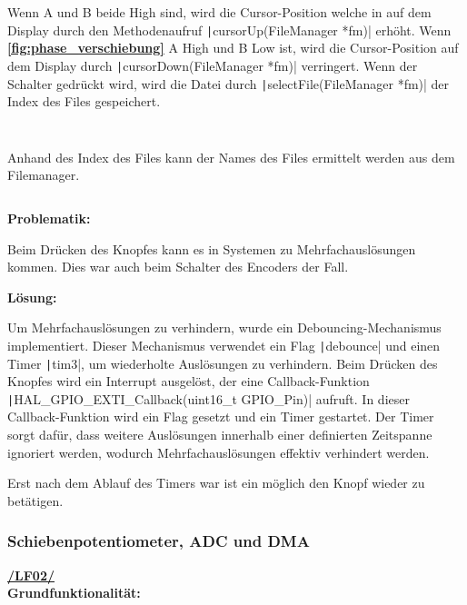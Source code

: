 Wenn A und B beide High sind\cite{rotary-encoder}, wird die Cursor-Position welche in auf dem Display durch den Methodenaufruf \texttt|cursorUp(FileManager *fm)|
erhöht. Wenn  \textbf{\autoref{fig:phase_verschiebung}} A High und B Low ist, wird die Cursor-Position auf dem Display durch \texttt|cursorDown(FileManager *fm)| verringert. Wenn der Schalter gedrückt wird, wird die Datei durch \texttt|selectFile(FileManager *fm)| der Index des Files gespeichert. 

\newpage 
 \inputminted[firstline=68, lastline=74]{c}{../../f401_display_encoder_fader_test/Core/Src/filemanager.c}
 
  \inputminted[firstline=84, lastline=90]{c}{../../f401_display_encoder_fader_test/Core/Src/filemanager.c}
  
Anhand des Index des Files kann der Names des Files ermittelt werden aus dem Filemanager.

	
\inputminted[firstline=159, lastline=161]{c}{../../f401_display_encoder_fader_test/Core/Src/filemanager.c}

\textbf{Problematik:}

Beim Drücken des Knopfes kann es in Systemen zu Mehrfachauslösungen kommen. Dies war auch beim Schalter des Encoders der Fall.

\textbf{Lösung:}

Um Mehrfachauslösungen zu verhindern, wurde ein Debouncing-Mechanismus implementiert. Dieser Mechanismus verwendet ein Flag \texttt|debounce| und einen Timer \texttt|tim3|, um wiederholte Auslösungen zu verhindern. Beim Drücken des Knopfes wird ein Interrupt ausgelöst, der eine Callback-Funktion \texttt|HAL_GPIO_EXTI_Callback(uint16_t GPIO_Pin)| aufruft. In dieser Callback-Funktion wird ein Flag gesetzt und ein Timer gestartet. Der Timer sorgt dafür, dass weitere Auslösungen innerhalb einer definierten Zeitspanne ignoriert werden, wodurch Mehrfachauslösungen effektiv verhindert werden.

Erst nach dem Ablauf des Timers war ist ein möglich den Knopf wieder zu betätigen.

\newpage
\subsubsection{Schiebenpotentiometer, ADC und DMA}
\textbf{\hyperlink{LF02_Link}{/LF02/}} \\

\textbf{Grundfunktionalität:}\\

